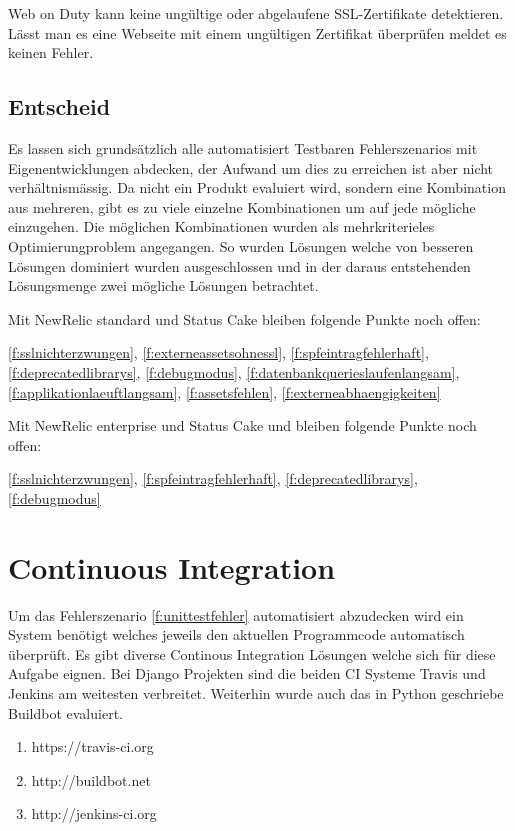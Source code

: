 Web on Duty kann keine ungültige oder abgelaufene SSL-Zertifikate detektieren. Lässt man es eine Webseite mit einem ungültigen Zertifikat überprüfen meldet es keinen Fehler.

\subsection{Entscheid}
\label{sub:entscheid_monitoring}
Es lassen sich grundsätzlich alle automatisiert Testbaren Fehlerszenarios mit Eigenentwicklungen abdecken, der Aufwand um dies zu erreichen ist aber nicht verhältnismässig. Da nicht ein Produkt evaluiert wird, sondern eine Kombination aus mehreren, gibt es zu viele einzelne Kombinationen um auf jede mögliche einzugehen. Die möglichen Kombinationen wurden als mehrkriterieles Optimierungproblem angegangen. So wurden Lösungen welche von besseren Lösungen dominiert wurden ausgeschlossen und in der daraus entstehenden Lösungsmenge zwei mögliche Lösungen betrachtet.


Mit NewRelic standard und Status Cake bleiben folgende Punkte noch offen:

\ref{f:sslnichterzwungen}, \ref{f:externeassetsohnessl}, \ref{f:spfeintragfehlerhaft}, \ref{f:deprecatedlibrarys}, \ref{f:debugmodus}, \ref{f:datenbankquerieslaufenlangsam}, \ref{f:applikationlaeuftlangsam}, \ref{f:assetsfehlen}, \ref{f:externeabhaengigkeiten}

Mit NewRelic enterprise und Status Cake und bleiben folgende Punkte noch offen:

\ref{f:sslnichterzwungen}, \ref{f:spfeintragfehlerhaft}, \ref{f:deprecatedlibrarys}, \ref{f:debugmodus}

\section{Continuous Integration}
\label{sec:continuous_integration_evaluation}
Um das Fehlerszenario \ref{f:unittestfehler} automatisiert abzudecken wird ein System benötigt welches jeweils den aktuellen Programmcode automatisch überprüft. Es gibt diverse Continous Integration Lösungen welche sich für diese Aufgabe eignen. Bei Django Projekten sind die beiden CI Systeme Travis und Jenkins am weitesten verbreitet. Weiterhin wurde auch das in Python geschriebe Buildbot evaluiert.

\begin{enumerate}
  \item https://travis-ci.org
  \item http://buildbot.net
  \item http://jenkins-ci.org
\end{enumerate}

